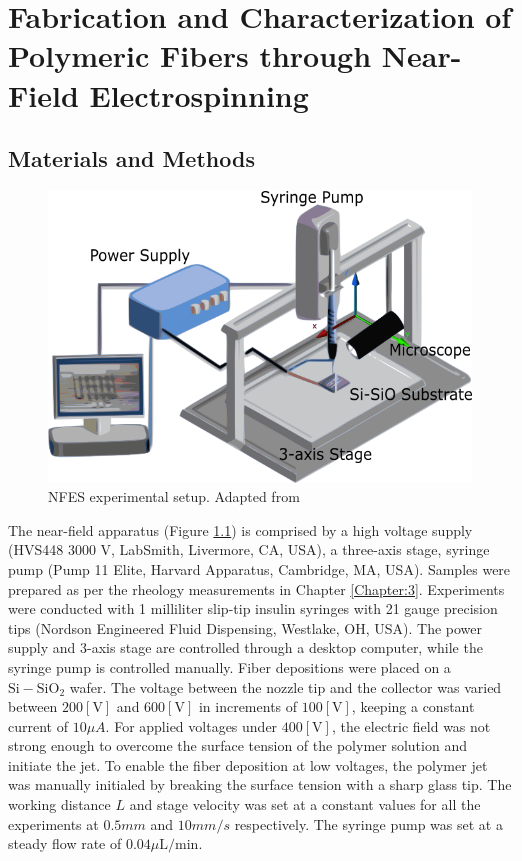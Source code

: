 
\chapter{Fabrication and Characterization of Polymeric Fibers through Near-Field Electrospinning} %

\label{Chapter:4}

\section{Materials and Methods}

\begin{figure}[!th]
\centering
\includegraphics[scale=0.50]{./Figures/NFESsetup.png}
\decoRule
\caption[NFES experimental setup]{NFES experimental setup. Adapted from \cite{Floreshernandez2020}}
\label{fig:NFESsetup}
\end{figure}

The near-field apparatus (Figure \ref{fig:NFESsetup}) is comprised by a high voltage supply (HVS448 3000 V, LabSmith, Livermore, CA, USA), a three-axis stage, syringe pump (Pump 11 Elite, Harvard Apparatus, Cambridge, MA, USA). Samples were prepared as per the rheology measurements in Chapter \ref{Chapter:3}. Experiments were conducted with 1 milliliter slip-tip insulin syringes with 21 gauge precision tips (Nordson Engineered Fluid Dispensing, Westlake, OH, USA). The power supply and 3-axis stage are controlled through a desktop computer, while the syringe pump is controlled manually. Fiber depositions were placed on a $\textrm{Si}-\textrm{SiO}_2$ wafer. The voltage between the nozzle tip and the collector was varied between $200 [\textrm{V}]$ and $600 [\textrm{V}]$ in increments of $100 [\textrm{V}]$, keeping a constant current of $10 \mu A$. For applied voltages under $400 [\textrm{V}]$, the electric field was not strong enough to overcome the surface tension of the polymer solution and initiate the jet. To enable the fiber deposition at low voltages, the polymer jet was manually initialed by breaking the surface tension with a sharp glass tip. The working distance $L$ and stage velocity was set at a constant values for all the experiments at $0.5 mm$ and $10 mm/s$ respectively. The syringe pump was set at a steady flow rate of $0.04 \mu \textrm{L} / \textrm{min}$.

